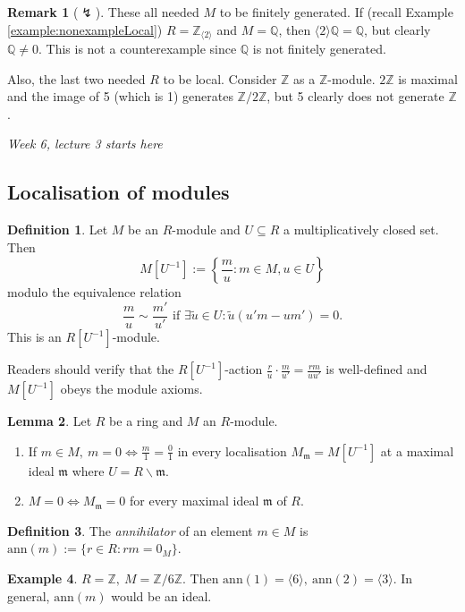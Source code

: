 \documentclass[a4paper]{article}
\newcommand{\m}{\mathfrak m}
\newcommand{\ann}{\text{ann}}
\theoremstyle{definition}
\newtheorem{defn}{Definition}[subsection]
\newtheorem{lemma}[defn]{Lemma}
\newtheorem{example}[defn]{Example}
\newtheorem*{remark}{Remark}
\begin{document}
\begin{remark}[$\lightning$]
These all needed $M$ to be finitely generated. If (recall Example \ref{example:nonexampleLocal}) $R=\mathbb Z_{\langle 2\rangle}$ and $M=\mathbb Q$, then $\langle 2\rangle \mathbb Q=\mathbb Q$, but clearly $\mathbb Q\neq 0$. This is not a counterexample since $\mathbb Q$ is not finitely generated.

Also, the last two needed $R$ to be local. Consider $\mathbb Z$ as a $\mathbb Z$-module. $2\mathbb Z$ is maximal and the image of 5 (which is 1) generates $\mathbb Z/2\mathbb Z$, but 5 clearly does not generate $\mathbb Z$.
\end{remark}

\begin{flushright}
\textit{Week 6, lecture 3 starts here}
\end{flushright}

\subsection{Localisation of modules}
\begin{defn}
Let $M$ be an $R$-module and $U\subseteq R$ a multiplicatively closed set. Then
\[
M\left[U^{-1}\right]:=\left\{\frac{m}{u}:m\in M,u\in U\right\}
\]
modulo the equivalence relation
\[
\frac{m}{u}\sim \frac{m'}{u'} \text{ if } \exists \widetilde u\in U:\widetilde u (u'm-um')=0.
\]
This is an $R\left[U^{-1}\right]$-module.
\end{defn}
Readers should verify that the $R\left[U^{-1}\right]$-action $\frac{r}{u}\cdot \frac{m}{u'}=\frac{rm}{uu'}$ is well-defined and $M\left[U^{-1}\right]$ obeys the module axioms.

\begin{lemma}
Let $R$ be a ring and $M$ an $R$-module.
\begin{enumerate}
\item If $m\in M,\ m=0 \Leftrightarrow \frac{m}{1}= \frac{0}{1}$ in every localisation $M_{\m}=M[U^{-1}]$ at a maximal ideal $\m$ where $U=R\backslash \m$.
\item $M=0 \Leftrightarrow M_{\m}=0$ for every maximal ideal $\m$ of $R$. 
\end{enumerate}
\end{lemma}

\begin{defn}
The \textit{annihilator} of an element $m\in M$ is $\ann(m):=\{r\in R:rm=0_M\}$.
\end{defn}
\begin{example}
$R=\mathbb Z,\ M=\mathbb Z/6\mathbb Z$. Then $\ann(1)=\langle 6\rangle,\ \ann(2)=\langle 3\rangle$. In general, $\ann(m)$ would be an ideal.
\end{example}
\end{document}
